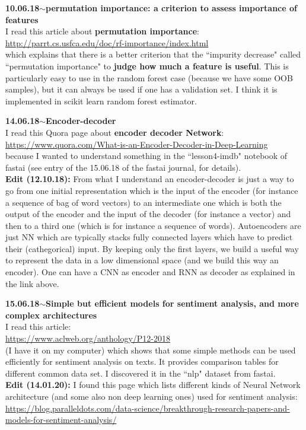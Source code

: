 \documentclass[11pt,a4paper]{article}
\newenvironment{loggentry}[2]%
{\noindent\textbf{#1}\hspace{1cm}$\mathbf{\sim}$\text{ }\textbf{#2}\\}{\vspace{0.5cm}}
\begin{document}
\begin{loggentry}{10.06.18}{permutation importance: a criterion to assess importance of features}
I read this article about \textbf{permutation importance}:\\
\url{http://parrt.cs.usfca.edu/doc/rf-importance/index.html}\\
which explains that there is a better criterion that the ``impurity decrease" called ``permutation importance" to \textbf{judge how much a feature is useful}. This is particularly easy to use in the random forest case (because we have some OOB samples), but it can always be used if one has a validation set. I think it is implemented in scikit learn random forest estimator.
\end{loggentry}

\begin{loggentry}{14.06.18}{Encoder-decoder}

I read this Quora page about \textbf{encoder decoder Network}:\\
\url{https://www.quora.com/What-is-an-Encoder-Decoder-in-Deep-Learning}\\
because I wanted to understand something in the ``lesson4-imdb" notebook of fastai (see entry of the 15.06.18 of the fastai journal, for details).\\
\textbf{Edit (12.10.18):} From what I understand an encoder-decoder is just a way to go from one initial representation which is the input of the encoder (for instance a sequence of bag of word vectors) to an intermediate one which is both the output of the encoder and the input of the decoder (for instance a vector) and then to a third one (which is for instance a sequence of words). Autoencoders are just NN which are typically stacks fully connected layers which have to predict their (cathegorical) input. By keeping only the first layers, we build a useful way to represent the data in a low dimensional space (and we build this way an encoder). One can have a CNN as encoder and RNN as decoder as explained in the link above.\\

\end{loggentry}

\begin{loggentry}{15.06.18}{Simple but efficient models for sentiment analysis, and more complex architectures}
I read this article:\\
\url{https://www.aclweb.org/anthology/P12-2018}\\
(I have it on my computer) which shows that some simple methods can be used efficiently for sentiment analysis on texts. It provides comparison tables for different common data set. I discovered it in the ``nlp" dataset from fastai.\\

\textbf{Edit (14.01.20):} I found this page which lists different kinds of Neural Network architecture (and some also non deep learning ones) used for sentiment analysis:\\
\url{https://blog.paralleldots.com/data-science/breakthrough-research-papers-and-models-for-sentiment-analysis/}
\end{loggentry}
\end{document}
